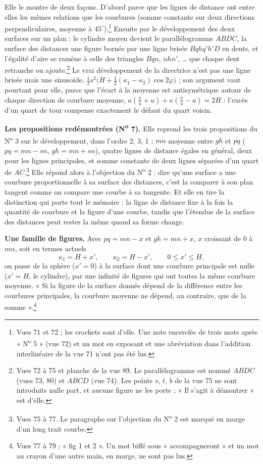 \documentclass[11pt,a4paper]{article}
\begin{document}
Elle le montre de deux façons. D'abord parce que les lignes de distance ont
entre elles les mêmes relations que les courbures (somme constante sur deux
directions perpendiculaires, moyenne à $45^\circ$).\footnote{Vues 71 et 72 ; les
crochets sont d'elle. Une note encerclée de trois mots après
« N\textsuperscript{o} 5 » (vue 72) et un mot en exposant et une abréviation dans
l'addition interlinéaire de la vue 71 n'ont pas été lus.} Ensuite par le
développement des deux surfaces sur un plan : le cylindre moyen devient le
parallélogramme $ABDC$, la surface des distances une figure bornée par une ligne
brisée $Bqhq'h'D$ en dents, et l'égalité d'aire se ramène à celle des triangles
$Bqn$, $nhn'$, … que chaque dent retranche ou ajoute.\footnote{Vues 72 à 75 et
planche de la vue 89. Le parallélogramme est nommé $ABDC$ (vues 73, 80) et $ABCD$
(vue 74). Les points $s$, $t$, $b$ de la vue 75 ne sont introduits nulle part, et
aucune figure ne les porte ; « Il s'agit à démontrer » est d'elle.} Le vrai
développement de la directrice n'est pas une ligne brisée mais une sinusoïde,
$\frac12 s^2\bigl(H + \frac12(\kappa_1-\kappa_2)\cos 2\varphi\bigr)$ ; son
argument vaut pourtant pour elle, parce que l'écart à la moyenne est
antisymétrique autour de chaque direction de courbure moyenne,
$\kappa(\frac\pi4 + u) + \kappa(\frac\pi4 - u) = 2H$ : l'excès d'un quart de tour
compense exactement le défaut du quart voisin.

\textbf{Les propositions redémontrées (N\textsuperscript{o} 7).} Elle reprend
les trois propositions du N\textsuperscript{o} 3 sur le développement, dans
l'ordre 2, 3, 1 : $mn$ moyenne entre $gh$ et $pq$ ($pq = mn - sn$, $gh = mn +
sn$), quatre lignes de distance égales en général, deux pour les lignes
principales, et somme constante de deux lignes séparées d'un quart de
$AC$.\footnote{Vues 75 à 77. Le paragraphe sur l'objection du
N\textsuperscript{o} 2 est marqué en marge d'un long trait courbe.} Elle répond
alors à l'objection du N\textsuperscript{o} 2 : dire qu'une surface a une
courbure proportionnelle à sa surface des distances, c'est la comparer à son
plan tangent comme on compare une courbe à sa tangente. Et elle en tire la
distinction qui porte tout le mémoire : la ligne de distance fixe à la fois la
quantité de courbure et la figure d'une courbe, tandis que l'étendue de la
surface des distances peut rester la même quand sa forme change.

\textbf{Une famille de figures.} Avec $pq = mn - x$ et $gh = mn + x$, $x$ croissant
de $0$ à $mn$, soit en termes actuels
\[
\kappa_1 = H + x', \qquad \kappa_2 = H - x', \qquad 0 \le x' \le H ,
\]
on passe de la sphère ($x' = 0$) à la surface dont une courbure principale est
nulle ($x' = H$, le cylindre), par une infinité de figures qui ont toutes la
même courbure moyenne. « Si la figure de la surface donnée dépend de la
différence entre les courbures principales, la courbure moyenne ne dépend, au
contraire, que de la somme ».\footnote{Vues 77 à 79 ; « fig 1 et 2 ». Un mot
biffé sous « accompagneront » et un mot au crayon d'une autre main, en marge, ne
sont pas lus.}
\end{document}
